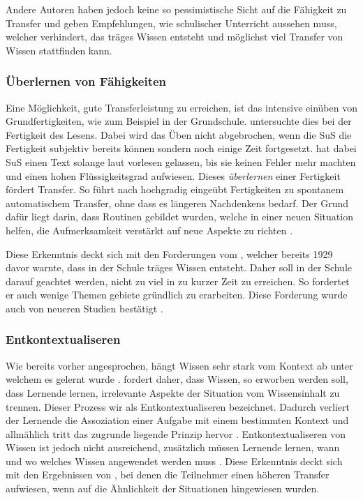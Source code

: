 Andere Autoren haben jedoch keine so pessimistische Sicht auf die Fähigkeit zu Transfer und geben Empfehlungen, wie schulischer Unterricht aussehen muss, welcher verhindert, das träges Wissen entsteht und möglichst viel Transfer von Wissen stattfinden kann.

\subsubsection{Überlernen von Fähigkeiten}
Eine Möglichkeit, gute Transferleistung zu erreichen, ist das intensive einüben von Grundfertigkeiten, wie zum Beispiel in der Grundschule. \citet{LaBerge1974} untersuchte dies bei der Fertigkeit des Lesens. Dabei wird das Üben nicht abgebrochen, wenn die SuS die Fertigkeit subjektiv bereits können sondern noch einige Zeit fortgesetzt. \citeauthor{LaBerge1974} hat dabei SuS einen Text solange laut vorlesen gelassen, bis sie keinen Fehler mehr machten und einen hohen Flüssigkeitsgrad aufwiesen. Dieses \textit{überlernen} einer Fertigkeit fördert Transfer. So führt nach \citet{Perkins1989} hochgradig eingeübt Fertigkeiten zu spontanem automatischem Transfer, ohne dass es längeren Nachdenkens bedarf. Der Grund dafür liegt darin, dass Routinen gebildet wurden, welche in einer neuen Situation helfen, die Aufmerksamkeit verstärkt auf neue Aspekte zu richten \citep{LaBerge1974, Mietzel2007}.

Diese Erkenntnis deckt sich mit den Forderungen vom \citet{Whitehead1929}, welcher bereits 1929 davor warnte, dass in der Schule träges Wissen entsteht. Daher soll in der Schule darauf geachtet werden, nicht zu viel in zu kurzer Zeit zu erreichen. So fordertet er auch wenige Themen gebiete gründlich zu erarbeiten. Diese Forderung wurde auch von neueren Studien bestätigt \citep{Porter1989,Brophy1992a,Millar1999}. 

\subsubsection{Entkontextualiseren}

Wie bereits vorher angesprochen, hängt Wissen sehr stark vom Kontext ab unter welchem es gelernt wurde \citep{Godden1975,Schoenfeld1988}. \citet{Anderson1996} fordert daher, dass Wissen, so erworben werden soll, dass Lernende lernen, irrelevante Aspekte der Situation vom Wissensinhalt zu trennen. Dieser Prozess wir als Entkontextualiseren bezeichnet. Dadurch verliert der Lernende die Assoziation einer Aufgabe mit einem bestimmten Kontext und allmählich tritt das zugrunde liegende Prinzip hervor \citet{Perkins1989}. Entkontextualiseren von Wissen ist jedoch nicht ausreichend, zusätzlich müssen Lernende lernen, wann und wo welches Wissen angewendet werden muss \citet{Wiggins1993}. Diese Erkenntnis deckt sich mit den Ergebnissen von \citet{Gick1980}, bei denen die Teilnehmer einen höheren Transfer aufwiesen, wenn auf die Ähnlichkeit der Situationen hingewiesen wurden.


